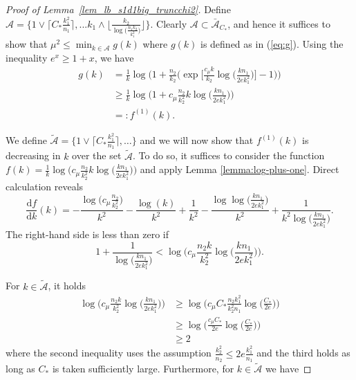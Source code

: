 \documentclass{article}
\newcommand{\D}{\textrm{d}}
\newcommand{\cA}{\mathcal{A}}
\newcommand{\Ct}{C_{*}}
\newcommand{\ju}[1]{{\color{blue}Julien: #1}}
\newcommand{\pa}[1]{{\color{red}Parker: #1}}
\begin{document}
\begin{proof}[Proof of Lemma~\ref{lem_lb_s1d1big_truncchi2}]
    Define $\cA = \{ 1 \vee \lceil\Ct \frac{k_1^2}{n_1} \rceil, ...k_1 \wedge \big\lfloor\frac{k_2}{\log\big(\frac{n_1k_2}{k_1^2}\big)} \big\rfloor \}$. Clearly $\cA \subset \bar{\cA}_{\Ct}$, and hence it suffices to show that $\mu^2 \leq \min_{k \in \cA}g(k)$ where $g(k)$ is defined as in (\ref{eq:g}). Using the inequality $e^x \geq 1 + x $, we have 
    \begin{align*}
        g(k) &= \frac{1}{k}\log\Bigg(1 + \frac{n_2}{k_2}\bigg(\exp\Big[\frac{c_\mu k}{k_2}\log\big(\frac{kn_1}{2ek_1^2}\big)\Big] - 1\bigg)\Bigg) \\
        &\geq \frac{1}{k}\log\Bigg(1 + c_\mu\frac{n_2}{k^2_2}k\log\Big(\frac{kn_1}{2ek_1^2}\Big)\Bigg) \\
        &=: f^{(1)}(k).
    \end{align*}
    
% 
%   
    We define $\widetilde{\mathcal{A}} = \{ 1 \vee \lceil\Ct \frac{k_1^2}{n_1} \rceil, \dots \}$ and we will now show that $f^{(1)}(k)$ is decreasing in $k$ over the set $\widetilde{\mathcal{A}}$. To do so, it suffices to consider the function $f(k) = \frac{1}{k}\log\Big(c_\mu\frac{n_2}{k^2_2}k\log\big(\frac{kn_1}{2ek_1^2}\big)\Big)$ and apply Lemma \ref{lemma:log-plus-one}. Direct calculation reveals
    \[\frac{\D f}{\D k}(k) = -\frac{\log\big(c_\mu\frac{n_2}{k_2^2}\big)}{k^2} - \frac{\log(k)}{k^2} + \frac{1}{k^2} - \frac{\log \log \big(\frac{kn_1}{2ek_1^2}\big)}{k^2} + \frac{1}{k^2\log\big(\frac{kn_1}{2ek_1^2}\big)}.\]
    The right-hand side is less than zero if   
    \[1 + \frac{1}{\log\big(\frac{kn_1}{2ek_1^2}\big)} < \log\Big(c_\mu\frac{n_2k}{k_2^2} \log \big(\frac{kn_1}{2ek_1^2}\big)\Big).\]
    
    For $k \in \widetilde{\mathcal{A}}$, it holds 
    \begin{align*}
        \log\Big(c_\mu\frac{n_2k}{k_2^2}\log \big(\frac{kn_1}{2ek_1^2}\big)\Big) 
        &\geq \log\Big(c_\mu \Ct \frac{n_2k_1^2}{k_2^2n_1}\log \big(\frac{\Ct}{2e}\big)\Big) \\
        &\geq \log\Big(\frac{c_\mu C_*}{2e} \log \big(\frac{\Ct}{2e}\big)\Big)\\
        &\geq 2
    \end{align*}
    where the second inequality uses the assumption $\frac{k_2^2}{n_2} \leq 2e\frac{k_1^2}{n_1}$ and the third holds as long as $\Ct$ is taken sufficiently large. Furthermore, for $k \in \widetilde{\mathcal{A}}$ we have 


\end{proof}
\end{document}
